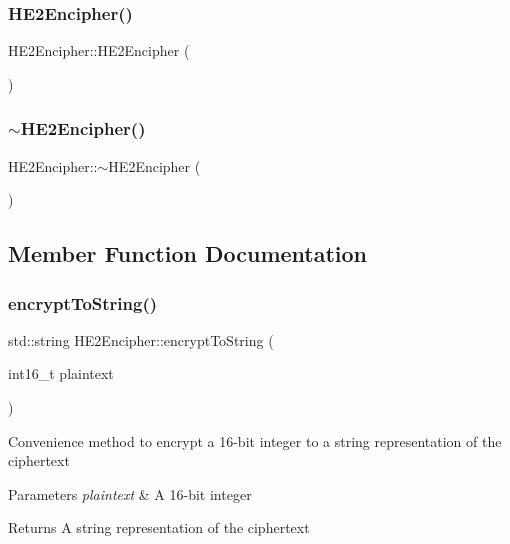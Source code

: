 \subsubsection{\texorpdfstring{H\+E2\+Encipher()}{HE2Encipher()}}
{\footnotesize\ttfamily H\+E2\+Encipher\+::\+H\+E2\+Encipher (\begin{DoxyParamCaption}{ }\end{DoxyParamCaption})}

\mbox{\label{classHE2Encipher_aa62b5f97090f8b14eeeff436664ef8e6}} 
\subsubsection{\texorpdfstring{$\sim$\+H\+E2\+Encipher()}{~HE2Encipher()}}
{\footnotesize\ttfamily H\+E2\+Encipher\+::$\sim$\+H\+E2\+Encipher (\begin{DoxyParamCaption}{ }\end{DoxyParamCaption})\hspace{0.3cm}{\ttfamily [virtual]}}



\subsection{Member Function Documentation}
\mbox{\label{classHE2Encipher_a3546d0dfa3e656ec6fcde1c0a4678460}} 
\subsubsection{\texorpdfstring{encrypt\+To\+String()}{encryptToString()}\hspace{0.1cm}{\footnotesize\ttfamily [1/4]}}
{\footnotesize\ttfamily std\+::string H\+E2\+Encipher\+::encrypt\+To\+String (\begin{DoxyParamCaption}\item[{int16\+\_\+t}]{plaintext }\end{DoxyParamCaption})\hspace{0.3cm}{\ttfamily [virtual]}}

Convenience method to encrypt a 16-\/bit integer to a string representation of the ciphertext 
\begin{DoxyParams}{Parameters}
{\em plaintext} & A 16-\/bit integer \\
\hline
\end{DoxyParams}
\begin{DoxyReturn}{Returns}
A string representation of the ciphertext 
\end{DoxyReturn}
\mbox{\label{classHE2Encipher_a10d552ea918c1c0a67f226745fed3ef6}} 
